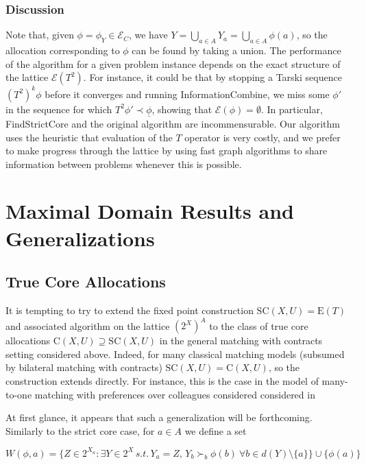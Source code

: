\documentclass[11pt,reqno]{amsart}
\theoremstyle{definition}
\numberwithin{equation}{section}
\newcommand{\ul}{\underline}
\newcommand{\pre}{\phi}
\newcommand{\prealloc}{(2^X)^A}
\newcommand{\strcore}{\mathrm{SC}(X,U)}
\newcommand{\core}{\mathrm{C}(X,U)}
\newcommand{\fecon}{\mathrm{E}}
\newcommand{\fix}{\mathcal{E}}
\newcommand{\su}{\succ}
\newcommand{\pe}{\prec}
\newcommand{\bopre}{\ul{\pre}}
\newcommand{\fixfind}{\mathcal{E}_C}
\begin{document}
\subsubsection{Discussion} 
Note that, given $\pre = \pre_Y \in \fixfind$, we have $Y = \bigcup_{a \in A} Y_a = \bigcup_{a \in A} \pre(a)$, so the allocation corresponding to $\pre$ can be found by taking a union.
The performance of the algorithm for a given problem instance depends on the exact structure of the lattice $\fix(T^2)$.
For instance, it could be that by stopping a Tarski sequence $(T^2)^k \pre$ before it converges and running InformationCombine, we miss some $\pre'$ in the sequence for which $T^2 \pre' \pe \bopre$, showing that $\fix(\pre) = \emptyset$. 
In particular, FindStrictCore and the original \cite{EcheniqueYenmez2013} algorithm are incommensurable. 
Our algorithm uses the heuristic that evaluation of the $T$ operator is very costly, and we prefer to make progress through the lattice by using fast graph algorithms to share information between problems whenever this is possible. 

\section{Maximal Domain Results and Generalizations} 
\subsection{True Core Allocations}
It is tempting to try to extend the fixed point construction $\strcore = \fecon(T)$ and associated algorithm on the lattice $\prealloc$ to the class of true core allocations $\core \supseteq \strcore$ in the general matching with contracts setting considered above. 
Indeed, for many classical matching models (subsumed by bilateral matching with contracts) $\strcore = \core$, so the construction extends directly.
For instance, this is the case in the model of many-to-one matching with preferences over colleagues considered considered in \cite{EcheniqueYenmez2013}

At first glance, it appears that such a generalization will be forthcoming. 
Similarly to the strict core case, for $a \in A$ we define a set 

\[
W(\pre, a) = \{Z \in 2^{X_a}: \exists Y \in 2^X \, s.t. \,  Y_a = Z, \, Y_b \su_b \pre(b) \: \forall b \in d(Y)\setminus\{a\} \} \cup \{\pre(a)\}
\]
\end{document}
